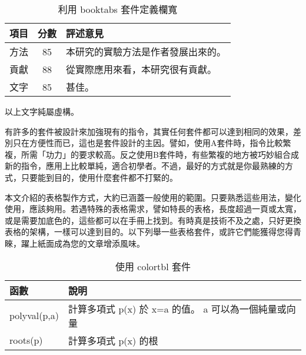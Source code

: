 \begin{table}[h]
    \centering
    \caption{利用 {\C booktabs} 套件定義欄寬}\label{tb:booktabs_1}
    \begin{tabular}{lcp{2.5cm}}%
    \toprule
    項目      & 分數	& 評述意見 \\\midrule
    方法      & 85   	& 本研究的實驗方法是作者發展出來的。 \\[2pt]
    貢獻      & 88   	& 從實際應用來看，本研究很有貢獻。 \\[2pt]
    文字      & 85   	& 甚佳。 \\
    \bottomrule
    \end{tabular}\par\smallskip %
    \parbox{5cm}{以上文字純屬虛構。}%
\end{table}

有許多的套件被設計來加強現有的指令，其實任何套件都可以達到相同的效果，差別只在方便性而已，這也是套件設計的主因。譬如，使用A套件時，指令比較繁複，所需「功力」的要求較高。反之使用B套件時，有些繁複的地方被巧妙組合成新的指令，應用上比較單純，適合初學者。不過，最好的方式就是你最熟練的方式，只要能到目的，使用什麼套件都不打緊的。

本文介紹的表格製作方式，大約已涵蓋一般使用的範圍。只要熟悉這些用法，變化使用，應該夠用。若遇特殊的表格需求，譬如特長的表格，長度超過一頁或太寬，或是需要加底色的，這些都可以在手冊上找到。有時真是技術不及之處，只好更換表格的架構，一樣可以達到目的。以下列舉一些表格套件，或許它們能獲得您得青睞，躍上紙面成為您的文章增添風味。

\begin{table}[h]
\begin{center}
\caption{使用 {\A colortbl} 套件}\label{tb:b}
\extrarowheight=4pt
\begin{tabular}{ll}
\rowcolor[gray]{.9}
函數			&	說明\\
\toprule
polyval(p,a)	&	計算多項式 p(x) 於 x=a 的值。 a  可以為一個純量或向量\\
roots(p)		&	計算多項式 p(x) 的根\\
\bottomrule
\end{tabular}
\end{center}
\vspace{1cm}
\end{table}

